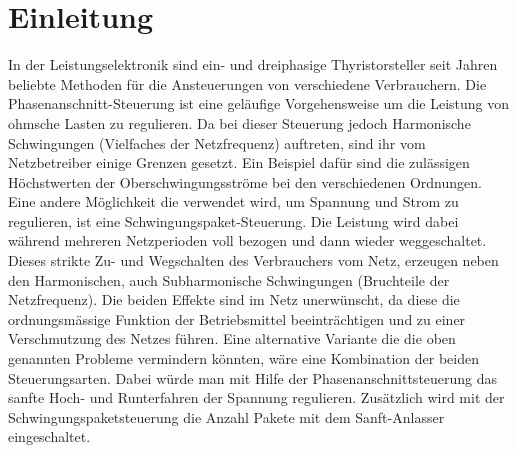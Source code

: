 \section{Einleitung}











In der Leistungselektronik sind ein- und dreiphasige Thyristorsteller seit Jahren beliebte Methoden für die Ansteuerungen von verschiedene Verbrauchern. Die Phasenanschnitt-Steuerung ist eine geläufige Vorgehensweise um die Leistung von ohmsche Lasten zu regulieren. Da bei dieser Steuerung jedoch Harmonische Schwingungen (Vielfaches der Netzfrequenz) auftreten, sind ihr vom Netzbetreiber einige Grenzen gesetzt. Ein Beispiel dafür sind die zulässigen Höchstwerten der Oberschwingungsströme bei den verschiedenen Ordnungen. Eine andere Möglichkeit die verwendet wird, um Spannung und Strom zu regulieren, ist eine Schwingungspaket-Steuerung. Die Leistung wird dabei während mehreren Netzperioden voll bezogen und dann wieder weggeschaltet. Dieses strikte Zu- und Wegschalten des Verbrauchers vom Netz, erzeugen neben den Harmonischen, auch Subharmonische Schwingungen (Bruchteile der Netzfrequenz). Die beiden Effekte sind im Netz unerwünscht, da diese die ordnungsmässige Funktion der Betriebsmittel beeinträchtigen und zu einer Verschmutzung des Netzes führen.
Eine alternative Variante die die oben genannten Probleme vermindern könnten, wäre eine Kombination der beiden Steuerungsarten. Dabei würde man mit Hilfe der Phasenanschnittsteuerung das sanfte Hoch- und Runterfahren der Spannung regulieren. Zusätzlich wird mit der Schwingungspaketsteuerung die Anzahl Pakete mit dem Sanft-Anlasser eingeschaltet.\\
